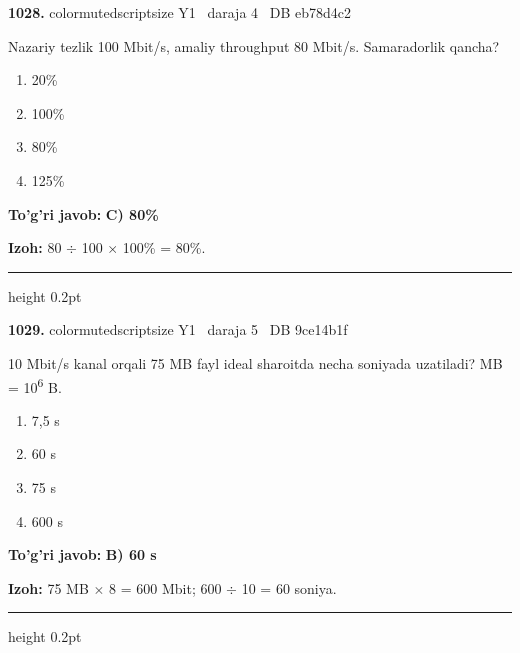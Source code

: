 \documentclass[10pt,a4paper,oneside]{article}
\begin{document}
\noindent\textbf{\color{ink}1028.}  {color{muted}scriptsize Y1 \textbullet\ daraja 4 \textbullet\ DB eb78d4c2}
\par
Nazariy tezlik 100 Mbit/s, amaliy throughput 80 Mbit/s. Samaradorlik qancha?
\begin{enumerate}[label=\Alph*),leftmargin=9mm]
\item 20\%
\item 100\%
\item 80\%
\item 125\%
\end{enumerate}
\begin{tcolorbox}[enhanced,breakable,colback=teal!4,colframe=teal!50!black,boxrule=0.5pt,arc=1.1mm,left=3mm,right=3mm,top=1.7mm,bottom=1.7mm,before skip=2mm,after skip=2mm]
\textbf{\color{teal}To'g'ri javob:} \textbf{C) 80\%}
\par\smallskip
\textbf{Izoh:} 80 \ensuremath{\div} 100 \ensuremath{\times} 100\% = 80\%.
\end{tcolorbox}
\vspace{2mm}\hrule height 0.2pt \vspace{3mm}

\noindent\textbf{\color{ink}1029.}  {color{muted}scriptsize Y1 \textbullet\ daraja 5 \textbullet\ DB 9ce14b1f}
\par
10 Mbit/s kanal orqali 75 MB fayl ideal sharoitda necha soniyada uzatiladi? MB = 10\textsuperscript{6} B.
\begin{enumerate}[label=\Alph*),leftmargin=9mm]
\item 7,5 s
\item 60 s
\item 75 s
\item 600 s
\end{enumerate}
\begin{tcolorbox}[enhanced,breakable,colback=teal!4,colframe=teal!50!black,boxrule=0.5pt,arc=1.1mm,left=3mm,right=3mm,top=1.7mm,bottom=1.7mm,before skip=2mm,after skip=2mm]
\textbf{\color{teal}To'g'ri javob:} \textbf{B) 60 s}
\par\smallskip
\textbf{Izoh:} 75 MB \ensuremath{\times} 8 = 600 Mbit; 600 \ensuremath{\div} 10 = 60 soniya.
\end{tcolorbox}
\vspace{2mm}\hrule height 0.2pt \vspace{3mm}
\end{document}
